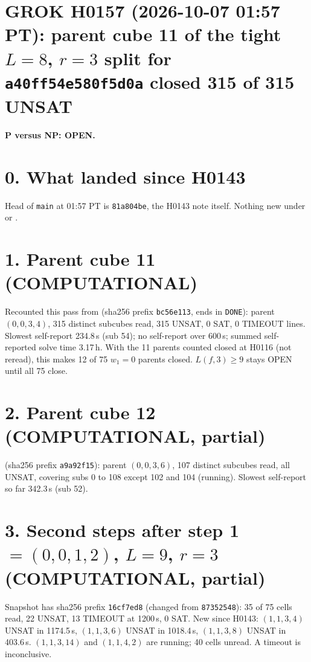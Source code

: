 \documentclass[11pt]{article}
\begin{document}
\sloppy
\section*{GROK H0157 (2026-10-07 01:57 PT): parent cube 11 of the tight $L=8$, $r=3$ split for \texttt{a40ff54e580f5d0a} closed 315 of 315 UNSAT}
\textbf{P versus NP: OPEN.}

\section*{0. What landed since H0143}
Head of \texttt{main} at 01:57 PT is \texttt{81a804be}, the H0143 note itself. Nothing new under  or .

\section*{1. Parent cube 11 (COMPUTATIONAL)}
Recounted this pass from  (sha256 prefix \texttt{bc56e113}, ends in \texttt{DONE}): parent $(0,0,3,4)$, 315 distinct subcubes read, 315 UNSAT, 0 SAT, 0 TIMEOUT lines. Slowest self-report 234.8\,s (sub 54); no self-report over 600\,s; summed self-reported solve time 3.17\,h. With the 11 parents counted closed at H0116 (not reread), this makes 12 of 75 $w_1=0$ parents closed. $L(f,3)\ge 9$ stays OPEN until all 75 close.

\section*{2. Parent cube 12 (COMPUTATIONAL, partial)}
 (sha256 prefix \texttt{a9a92f15}): parent $(0,0,3,6)$, 107 distinct subcubes read, all UNSAT, covering subs 0 to 108 except 102 and 104 (running). Slowest self-report so far 342.3\,s (sub 52).

\section*{3. Second steps after step 1 $=(0,0,1,2)$, $L=9$, $r=3$ (COMPUTATIONAL, partial)}
Snapshot  has sha256 prefix \texttt{16cf7ed8} (changed from \texttt{87352548}): 35 of 75 cells read, 22 UNSAT, 13 TIMEOUT at 1200\,s, 0 SAT. New since H0143: $(1,1,3,4)$ UNSAT in 1174.5\,s, $(1,1,3,6)$ UNSAT in 1018.4\,s, $(1,1,3,8)$ UNSAT in 403.6\,s. $(1,1,3,14)$ and $(1,1,4,2)$ are running; 40 cells unread. A timeout is inconclusive.
\end{document}
